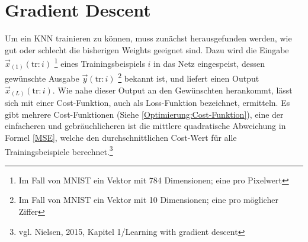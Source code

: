 \documentclass[
	a4paper,
	12pt,
	ngerman,
	oneside
]{scrreprt}											%
\newcommand{\practitioner}[1]{vgl. Gibson \& Patterson, 2017, S. {#1}}
\begin{document}
		
	
		\section{Gradient Descent}\label{GradientDescent}
			Um ein KNN trainieren zu können, muss zunächst herausgefunden werden, wie gut oder schlecht die bisherigen Weights geeignet sind. Dazu wird die Eingabe\break\mbox{$\vec{x}_{(1)}(\textrm{tr}:i)$} \footnote{Im Fall von MNIST ein Vektor mit 784 Dimensionen; eine pro Pixelwert} eines Trainingsbeispiels $i$ in das Netz eingespeist, dessen gewünschte Ausgabe \mbox{$\vec{y}(\textrm{tr}:i)$} \footnote{Im Fall von MNIST ein Vektor mit 10 Dimensionen; eine pro möglicher Ziffer} bekannt ist, und liefert einen Output \mbox{$\vec{x}_{(L)}(\textrm{tr}:i)$}. Wie nahe dieser Output an den Gewünschten herankommt, lässt sich mit einer Cost-Funktion, auch als Loss-Funktion bezeichnet, ermitteln. Es gibt mehrere Cost-Funktionen (Siehe \ref{Optimierung:Cost-Funktion}), eine der einfacheren und gebräuchlicheren ist die mittlere quadratische Abweichung in Formel \ref{MSE}, welche den durchschnittlichen Cost-Wert für alle Trainingsbeispiele berechnet.\footnote{vgl. Nielsen, 2015, Kapitel 1/Learning with gradient descent}
	
\end{document}
